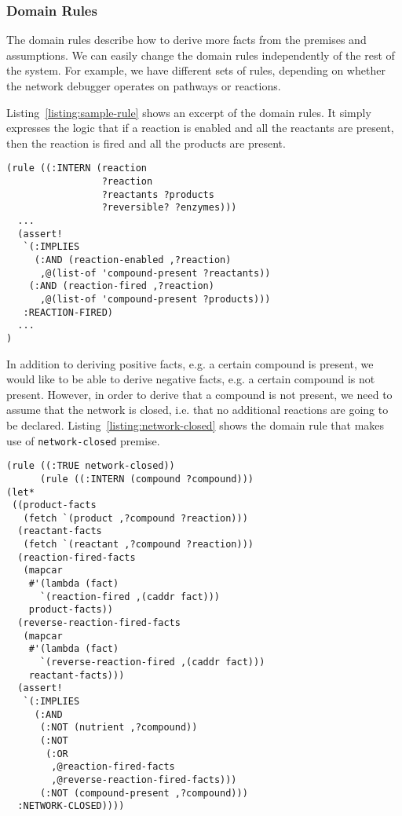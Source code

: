 \subsubsection{Domain Rules}
\label{sec:domain-rules}

The domain rules describe how to derive more facts from the premises
and assumptions. We can easily change the domain rules independently
of the rest of the system. For example, we have different sets of
rules, depending on whether the network debugger operates on pathways
or reactions.

Listing~\ref{listing:sample-rule} shows an excerpt of the domain
rules. It simply expresses the logic that if a reaction is enabled and
all the reactants are present, then the reaction is fired and all the
products are present.

\begin{lstlisting}[label={listing:sample-rule},caption={Excerpt of Domain Rules}]
(rule ((:INTERN (reaction 
                 ?reaction 
                 ?reactants ?products 
                 ?reversible? ?enzymes)))
  ...
  (assert! 
   `(:IMPLIES
     (:AND (reaction-enabled ,?reaction)
      ,@(list-of 'compound-present ?reactants))
    (:AND (reaction-fired ,?reaction)
      ,@(list-of 'compound-present ?products)))
   :REACTION-FIRED)
  ...
)
\end{lstlisting}

In addition to deriving positive facts, e.g. a certain compound is
present, we would like to be able to derive negative facts, e.g. a
certain compound is not present. However, in order to derive that a
compound is not present, we need to assume that the network is closed,
i.e. that no additional reactions are going to be
declared. Listing~\ref{listing:network-closed} shows the domain rule
that makes use of {\small\tt network-closed} premise.

\begin{lstlisting}[label={listing:network-closed},caption={Domain rule for deriving absence of compound}]
(rule ((:TRUE network-closed))
      (rule ((:INTERN (compound ?compound)))
(let* 
 ((product-facts 
   (fetch `(product ,?compound ?reaction)))
  (reactant-facts 
   (fetch `(reactant ,?compound ?reaction)))
  (reaction-fired-facts 
   (mapcar 
    #'(lambda (fact) 
      `(reaction-fired ,(caddr fact))) 
    product-facts))
  (reverse-reaction-fired-facts 
   (mapcar 
    #'(lambda (fact) 
      `(reverse-reaction-fired ,(caddr fact))) 
    reactant-facts)))
  (assert! 
   `(:IMPLIES 
     (:AND
      (:NOT (nutrient ,?compound))
      (:NOT 
       (:OR 
        ,@reaction-fired-facts 
        ,@reverse-reaction-fired-facts)))
      (:NOT (compound-present ,?compound)))
  :NETWORK-CLOSED))))
\end{lstlisting}

